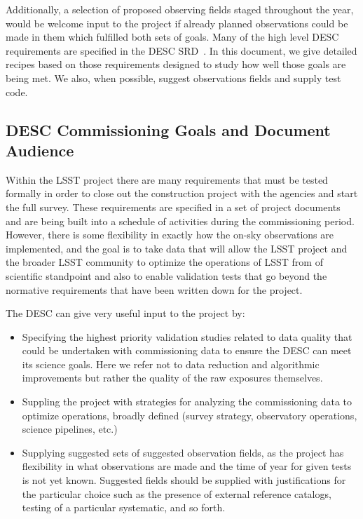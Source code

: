 \documentclass[modern]{desc-tex/styles/lsstdescnote}
\begin{document}
Additionally, a selection of proposed observing fields staged throughout the year, would be welcome input to the project if already planned observations could be made in them which fulfilled both sets of goals.  Many of the high level DESC requirements are specified in the DESC SRD~\cite{DESC-SRD}.  In this document, we  give detailed recipes based on those requirements designed to study how well those goals are being met. We also, when possible, suggest observations fields and supply test code.

\subsection{DESC Commissioning Goals and Document Audience}

Within the LSST project there are many requirements that must be tested formally in order to close out the construction project with the agencies and start the full survey. These requirements are specified in a set of project documents and are being built into a schedule of activities during the commissioning period. However, there is some flexibility in exactly how the on-sky observations are implemented, and the goal is to take data that will allow the LSST project and  the broader LSST community to optimize the operations of LSST from of scientific standpoint and also to enable validation tests that go beyond the normative requirements that have been written down for the project.

The DESC can give very useful input to the project by:

\begin{itemize}

\item  Specifying the highest priority validation studies related to data quality that could be undertaken with commissioning data to ensure the DESC can meet its science goals.  Here we refer not to data reduction and algorithmic improvements but rather the quality of the raw exposures themselves.

\item Suppling the project with strategies for analyzing the commissioning data to optimize operations, broadly defined (survey strategy, observatory operations, science pipelines, etc.)

\item Supplying suggested sets of suggested observation fields, as the project has flexibility in what observations are made and the time of year for given tests is not yet known.  Suggested fields should be supplied with justifications for the particular choice such as the presence of external reference catalogs, testing of a particular systematic, and so forth.
  
\end{itemize}
\end{document}
